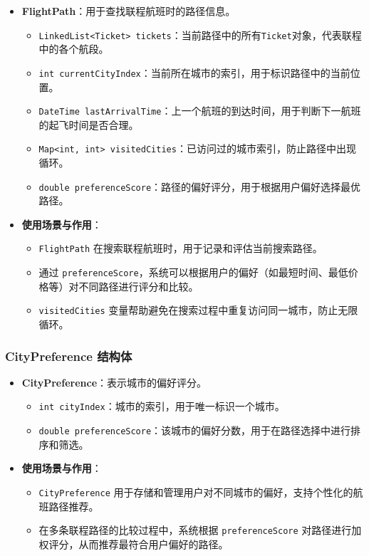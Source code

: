 \documentclass[UTF8, a4paper,12pt]{ctexart}
\begin{document}
\begin{itemize}
    \item \textbf{FlightPath}：用于查找联程航班时的路径信息。
    \begin{itemize}
        \item \texttt{LinkedList<Ticket> tickets}：当前路径中的所有\texttt{Ticket}对象，代表联程中的各个航段。
        \item \texttt{int currentCityIndex}：当前所在城市的索引，用于标识路径中的当前位置。
        \item \texttt{DateTime lastArrivalTime}：上一个航班的到达时间，用于判断下一航班的起飞时间是否合理。
        \item \texttt{Map<int, int> visitedCities}：已访问过的城市索引，防止路径中出现循环。
        \item \texttt{double preferenceScore}：路径的偏好评分，用于根据用户偏好选择最优路径。
    \end{itemize}
    \item \textbf{使用场景与作用}：
    \begin{itemize}
        \item \texttt{FlightPath} 在搜索联程航班时，用于记录和评估当前搜索路径。
        \item 通过 \texttt{preferenceScore}，系统可以根据用户的偏好（如最短时间、最低价格等）对不同路径进行评分和比较。
        \item \texttt{visitedCities} 变量帮助避免在搜索过程中重复访问同一城市，防止无限循环。
    \end{itemize}
\end{itemize}

\subsubsection{CityPreference 结构体}

\begin{itemize}
    \item \textbf{CityPreference}：表示城市的偏好评分。
    \begin{itemize}
        \item \texttt{int cityIndex}：城市的索引，用于唯一标识一个城市。
        \item \texttt{double preferenceScore}：该城市的偏好分数，用于在路径选择中进行排序和筛选。
    \end{itemize}
    \item \textbf{使用场景与作用}：
    \begin{itemize}
        \item \texttt{CityPreference} 用于存储和管理用户对不同城市的偏好，支持个性化的航班路径推荐。
        \item 在多条联程路径的比较过程中，系统根据 \texttt{preferenceScore} 对路径进行加权评分，从而推荐最符合用户偏好的路径。
    \end{itemize}
\end{itemize}
\end{document}
